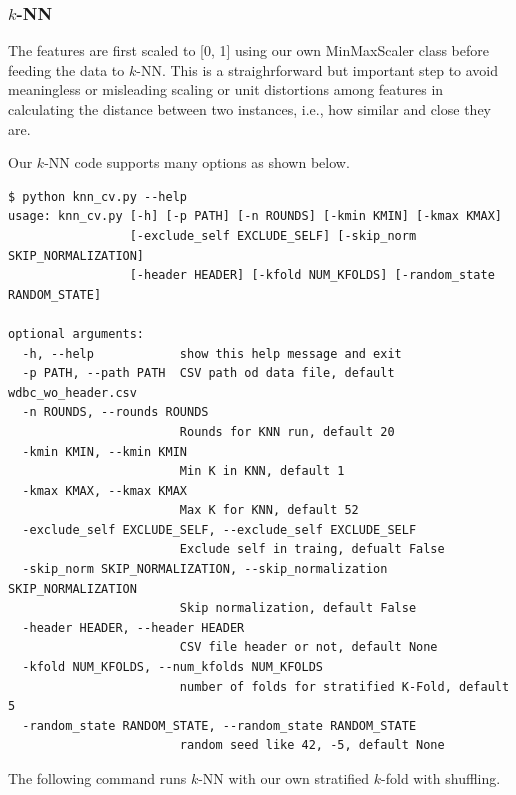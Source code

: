 \subsubsection{$k$-NN}

The features are first scaled to [0, 1] using our own MinMaxScaler class before feeding the data to $k$-NN.  This is a straighrforward but important step to avoid meaningless or misleading scaling or unit distortions among features in calculating the distance between two instances, i.e., how similar and close they are.  

Our $k$-NN code supports many options as shown below.  

\begin{verbatim}
$ python knn_cv.py --help
usage: knn_cv.py [-h] [-p PATH] [-n ROUNDS] [-kmin KMIN] [-kmax KMAX]
                 [-exclude_self EXCLUDE_SELF] [-skip_norm SKIP_NORMALIZATION]
                 [-header HEADER] [-kfold NUM_KFOLDS] [-random_state RANDOM_STATE]

optional arguments:
  -h, --help            show this help message and exit
  -p PATH, --path PATH  CSV path od data file, default wdbc_wo_header.csv
  -n ROUNDS, --rounds ROUNDS
                        Rounds for KNN run, default 20
  -kmin KMIN, --kmin KMIN
                        Min K in KNN, default 1
  -kmax KMAX, --kmax KMAX
                        Max K for KNN, default 52
  -exclude_self EXCLUDE_SELF, --exclude_self EXCLUDE_SELF
                        Exclude self in traing, defualt False
  -skip_norm SKIP_NORMALIZATION, --skip_normalization SKIP_NORMALIZATION
                        Skip normalization, default False
  -header HEADER, --header HEADER
                        CSV file header or not, default None
  -kfold NUM_KFOLDS, --num_kfolds NUM_KFOLDS
                        number of folds for stratified K-Fold, default 5
  -random_state RANDOM_STATE, --random_state RANDOM_STATE
                        random seed like 42, -5, default None
\end{verbatim}

The following command runs $k$-NN with our own stratified $k$-fold with shuffling.  


